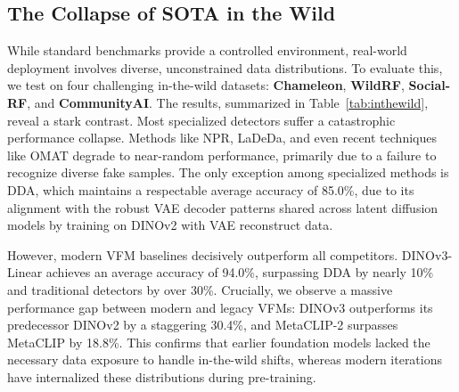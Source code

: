 \documentclass[sigconf,screen]{acmart}
\theoremstyle{plain}
\theoremstyle{definition}
\theoremstyle{remark}
\begin{document}
\subsection{The Collapse of SOTA in the Wild}
While standard benchmarks provide a controlled environment, real-world deployment involves diverse, unconstrained data distributions. To evaluate this, we test on four challenging in-the-wild datasets: \textbf{Chameleon}, \textbf{WildRF}, \textbf{Social-RF}, and \textbf{CommunityAI}. The results, summarized in Table~\ref{tab:inthewild}, reveal a stark contrast.
Most specialized detectors suffer a catastrophic performance collapse. Methods like NPR, LaDeDa, and even recent techniques like OMAT degrade to near-random performance, primarily due to a failure to recognize diverse fake samples. The only exception among specialized methods is DDA, which maintains a respectable average accuracy of 85.0\%, due to its alignment with the robust VAE decoder patterns shared across latent diffusion models by training on DINOv2 with VAE reconstruct data.

However, modern VFM baselines decisively outperform all competitors. DINOv3-Linear achieves an average accuracy of 94.0\%, surpassing DDA by nearly 10\% and traditional detectors by over 30\%. Crucially, we observe a massive performance gap between modern and legacy VFMs: DINOv3 outperforms its predecessor DINOv2 by a staggering 30.4\%, and MetaCLIP-2 surpasses MetaCLIP by 18.8\%. This confirms that earlier foundation models lacked the necessary data exposure to handle in-the-wild shifts, whereas modern iterations have internalized these distributions during pre-training.
\end{document}
